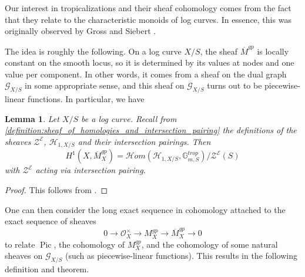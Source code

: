 \documentclass[a4paper,11pt]{amsart} %
\numberwithin{equation}{subsection}
\newcommand{\on}[1]{\operatorname{#1}}
\newcommand{\bb}[1]{{\mathbb{#1}}}
\newcommand{\ca}[1]{{\mathcal{#1}}}
\def\sheafhom{\mathcal{H}om}
\def\o#1{\overline{#1}}
\theoremstyle{definition}
\theoremstyle{plain}%
\newtheorem{lemma}[definition]{Lemma}
\theoremstyle{remark}
\begin{document}
Our interest in tropicalizations and their sheaf cohomology comes from the fact that they relate to the characteristic monoids of log curves. In essence, this was originally observed by Gross and Siebert \cite[Section 1.4]{GrossSiebert}.

The idea is roughly the following. On a log curve $X/S$, the sheaf $\o M^{gp}$ is locally constant on the smooth locus, so it is determined by its values at nodes and one value per component. In other words, it comes from a sheaf on the dual graph $\ca G_{X/S}$ in some appropriate sense, and this sheaf on $\ca G_{X/S}$ turns out to be piecewise-linear functions. In particular, we have

\begin{lemma}
    Let $X/S$ be a log curve. Recall from \ref{definition:sheaf_of_homologies_and_intersection_pairing} the definitions of the sheaves $\ca Z^{\ca E}$, $\ca H_{1,X/S}$ and their intersection pairings. Then
    \[
    H^1(X,\o M_X^{gp}) = \sheafhom(\ca H_{1,X/S},\bb G_{m,S}^{trop})/\ca Z^{\ca E}(S)
    \]
    with $\ca Z^{\ca E}$ acting via intersection pairing.
\end{lemma}

\begin{proof}
    This follows from \cite[Lemma 2.4.2.4 and Lemma 3.4.7]{molcho_wise_2022}.
\end{proof}

One can then consider the long exact sequence in cohomology attached to the exact sequence of sheaves
\[
0 \to \ca O_X^\times \to M_X^{gp} \to \o M_X^{gp} \to 0
\]
to relate $\on{Pic}$, the cohomology of $M_X^{gp}$, and the cohomology of some natural sheaves on $\ca G_{X/S}$ (such as piecewise-linear functions). This results in the following definition and theorem.
\end{document}
